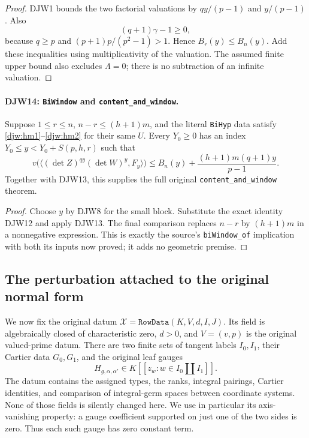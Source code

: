 \begin{proof}
DJW1 bounds the two factorial valuations by $qy/(p-1)$ and
$y/(p-1)$.  Also
\[
 (q+1)\gamma-1\ge0,
\]
because $q\ge p$ and
$(p+1)p/(p^2-1)>1$.  Hence $B_r(y)\le B_n(y)$.
Add these inequalities using multiplicativity of the valuation.
The assumed finite upper bound also excludes $\Lambda=0$;
there is no subtraction of an infinite valuation.
\end{proof}

\paragraph{DJW14: \texttt{BiWindow} and \texttt{content\_and\_window}.}
\label{claim:DJW14}
Suppose $1\le r\le n$, $n-r\le(h+1)m$, and the literal
\texttt{BiHyp} data satisfy \eqref{djw:hm1}--\eqref{djw:hm2}
for their same $U$.  Every $Y_0\ge0$ has an index
$Y_0\le y<Y_0+S(p,h,r)$ such that
\begin{equation}
 v\bigl(\langle(\det Z)^{qy}(\det W)^y,F_y\rangle\bigr)
 \le B_n(y)+\frac{(h+1)m(q+1)y}{p-1}.
 \label{djw:biwindow}
\end{equation}
Together with DJW13, this supplies the full original
\texttt{content\_and\_window} theorem.

\begin{proof}
Choose $y$ by DJW8 for the small block.  Substitute the exact
identity DJW12 and apply DJW13.  The final comparison replaces
$n-r$ by $(h+1)m$ in a nonnegative expression.  This is exactly
the source's \texttt{biWindow\_of} implication with both its
inputs now proved; it adds no geometric premise.
\end{proof}

\subsection{The perturbation attached to the original normal form}

We now fix the original datum
$\mathcal X=\texttt{RowData}(K,V,d,I,J)$.
Its field is algebraically closed of characteristic zero, $d>0$,
and $V=(v,p)$ is the original valued-prime datum.
There are two finite sets of tangent labels $I_0,I_1$, their
Cartier data $G_0,G_1$, and the original leaf gauges
\[
 H_{g,\alpha,\alpha'}\in
 K[[z_w:w\in I_0\amalg I_1]].
\]
The datum contains the assigned types, the ranks, integral pairings,
Cartier identities, and comparison of integral-germ spaces between
coordinate systems.  None of those fields is silently changed here.
We use in particular its axis-vanishing property: a gauge coefficient
supported on just one of the two sides is zero.  Thus each such
gauge has zero constant term.

